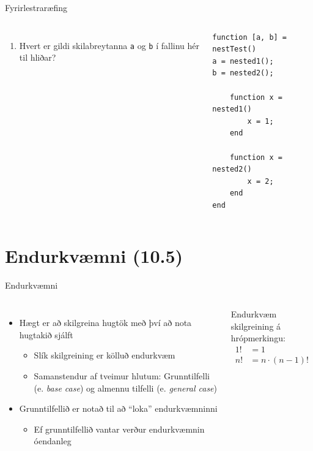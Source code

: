 \documentclass{beamer}
\begin{document}
\begin{frame}[fragile]{Fyrirlestraræfing}
\begin{columns}
\begin{enumerate}
 \item Hvert er gildi skilabreytanna \texttt{a} og \texttt{b} í fallinu hér til hliðar?
\end{enumerate}

\begin{verbatim}
function [a, b] = nestTest()
a = nested1();
b = nested2();

    function x = nested1()
        x = 1;
    end

    function x = nested2()
        x = 2;
    end
end
\end{verbatim}

\end{columns}
\end{frame}

\section{Endurkvæmni (10.5)}

\begin{frame}[fragile]{Endurkvæmni}
\begin{columns}
\begin{itemize}
 \item Hægt er að skilgreina hugtök með því að nota hugtakið sjálft
 \begin{itemize}
  \item Slík skilgreining er kölluð endurkvæm
  \item Samanstendur af tveimur hlutum: Grunntilfelli (e. \emph{base case}) og almennu tilfelli (e. \emph{general case})
 \end{itemize}
 \item Grunntilfellið er notað til að ``loka'' endurkvæmninni
 \begin{itemize}
  \item Ef grunntilfellið vantar verður endurkvæmnin óendanleg
 \end{itemize}
\end{itemize}

\vspace{0.1cm}
Endurkvæm skilgreining á hrópmerkingu:
\begin{align*}
1! &= 1\\
n! &= n\cdot(n-1)!\\
\end{align*}


\end{columns}
\end{frame}
\end{document}
